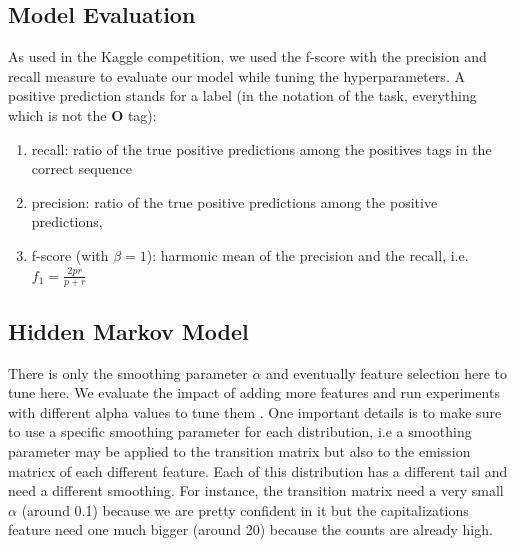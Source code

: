 \documentclass[11pt]{article}
\begin{document}
\subsection{Model Evaluation}

As used in the Kaggle competition, we used the f-score with the precision and recall measure to evaluate our model while tuning the hyperparameters. A positive prediction stands for a label (in the notation of the task, everything which is not the \textbf{O} tag):

\begin{enumerate}
	\item recall: ratio of the true positive predictions among the positives tags in the correct sequence
	\item precision: ratio of the true positive predictions among the positive predictions,
	\item f-score (with $\beta = 1$): harmonic mean of the precision and the recall, i.e. $f_{1} = \frac{2pr}{p+r}$
\end{enumerate}

\subsection{Hidden Markov Model}

There is only the smoothing parameter $\alpha$ and eventually feature selection here to tune here. We evaluate the impact of adding more features and run experiments with different alpha values to tune them . One important details is to make sure to use a specific smoothing parameter for each distribution, i.e a smoothing parameter may be applied to the transition matrix but also to the emission matricx of each different feature. Each of this distribution has a different tail and need a different smoothing. For instance, the transition matrix need a very small $\alpha$ (around 0.1) because we are pretty confident in it but the capitalizations feature need one much bigger (around 20) because the counts are already high.
\end{document}
